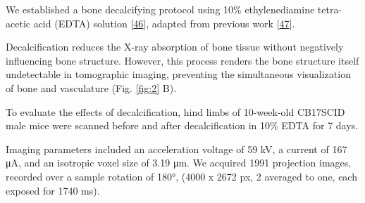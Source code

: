 We established a bone decalcifying protocol using 10\% ethylenediamine tetra-acetic acid (EDTA) solution {[}\protect\hyperlink{ref-iM9i6gkJ}{46}{]}, adapted from previous work {[}\protect\hyperlink{ref-168Ee16HU}{47}{]}.

Decalcification reduces the X-ray absorption of bone tissue without negatively influencing bone structure.
However, this process renders the bone structure itself undetectable in tomographic imaging, preventing the simultaneous visualization of bone and vasculature (Fig. \ref{fig:2} B).

To evaluate the effects of decalcification, hind limbs of 10-week-old CB17SCID male mice were scanned before and after decalcification in 10\% EDTA for 7 days.

Imaging parameters included an acceleration voltage of 59 kV, a current of 167 μA, and an isotropic voxel size of 3.19 μm.
We acquired 1991 projection images, recorded over a sample rotation of 180°, (4000 x 2672 px, 2 averaged to one, each exposed for 1740 ms).

